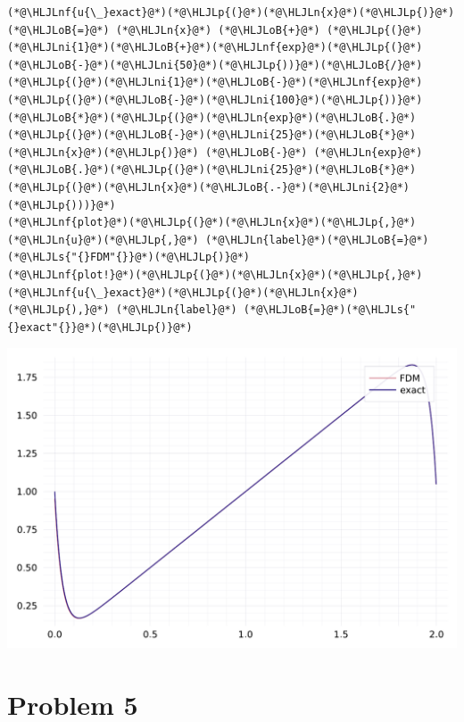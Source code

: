 \documentclass[12pt,a4paper]{article}
\newcommand{\HLJLn}[1]{#1}
\newcommand{\HLJLnf}[1]{\textcolor[RGB]{66,102,213}{#1}}
\newcommand{\HLJLs}[1]{\textcolor[RGB]{201,61,57}{#1}}
\newcommand{\HLJLni}[1]{\textcolor[RGB]{59,151,46}{#1}}
\newcommand{\HLJLoB}[1]{\textcolor[RGB]{102,102,102}{\textbf{#1}}}
\newcommand{\HLJLp}[1]{#1}
\begin{document}
\begin{lstlisting}
(*@\HLJLnf{u{\_}exact}@*)(*@\HLJLp{(}@*)(*@\HLJLn{x}@*)(*@\HLJLp{)}@*) (*@\HLJLoB{=}@*) (*@\HLJLn{x}@*) (*@\HLJLoB{+}@*) (*@\HLJLp{(}@*)(*@\HLJLni{1}@*)(*@\HLJLoB{+}@*)(*@\HLJLnf{exp}@*)(*@\HLJLp{(}@*)(*@\HLJLoB{-}@*)(*@\HLJLni{50}@*)(*@\HLJLp{))}@*)(*@\HLJLoB{/}@*)(*@\HLJLp{(}@*)(*@\HLJLni{1}@*)(*@\HLJLoB{-}@*)(*@\HLJLnf{exp}@*)(*@\HLJLp{(}@*)(*@\HLJLoB{-}@*)(*@\HLJLni{100}@*)(*@\HLJLp{))}@*)(*@\HLJLoB{*}@*)(*@\HLJLp{(}@*)(*@\HLJLn{exp}@*)(*@\HLJLoB{.}@*)(*@\HLJLp{(}@*)(*@\HLJLoB{-}@*)(*@\HLJLni{25}@*)(*@\HLJLoB{*}@*)(*@\HLJLn{x}@*)(*@\HLJLp{)}@*) (*@\HLJLoB{-}@*) (*@\HLJLn{exp}@*)(*@\HLJLoB{.}@*)(*@\HLJLp{(}@*)(*@\HLJLni{25}@*)(*@\HLJLoB{*}@*)(*@\HLJLp{(}@*)(*@\HLJLn{x}@*)(*@\HLJLoB{.-}@*)(*@\HLJLni{2}@*)(*@\HLJLp{)))}@*)
(*@\HLJLnf{plot}@*)(*@\HLJLp{(}@*)(*@\HLJLn{x}@*)(*@\HLJLp{,}@*) (*@\HLJLn{u}@*)(*@\HLJLp{,}@*) (*@\HLJLn{label}@*)(*@\HLJLoB{=}@*)(*@\HLJLs{"{}FDM"{}}@*)(*@\HLJLp{)}@*)
(*@\HLJLnf{plot!}@*)(*@\HLJLp{(}@*)(*@\HLJLn{x}@*)(*@\HLJLp{,}@*)(*@\HLJLnf{u{\_}exact}@*)(*@\HLJLp{(}@*)(*@\HLJLn{x}@*)(*@\HLJLp{),}@*) (*@\HLJLn{label}@*) (*@\HLJLoB{=}@*)(*@\HLJLs{"{}exact"{}}@*)(*@\HLJLp{)}@*)
\end{lstlisting}

\includegraphics[width=\linewidth]{figures/ass_4_report_8_1.pdf}

\section{Problem 5}
\end{document}
